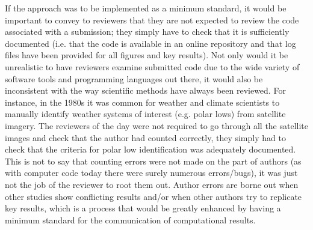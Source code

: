 If the \citet{Irving2015} approach was to be implemented as a minimum standard, it would be important to convey to reviewers that they are not expected to review the code associated with a submission; they simply have to check that it is sufficiently documented (i.e. that the code is available in an online repository and that log files have been provided for all figures and key results). Not only would it be unrealistic to have reviewers examine submitted code due to the wide variety of software tools and programming languages out there, it would also be inconsistent with the way scientific methods have always been reviewed. For instance, in the 1980s it was common for weather and climate scientists to manually identify weather systems of interest (e.g. polar lows) from satellite imagery. The reviewers of the day were not required to go through all the satellite images and check that the author had counted correctly, they simply had to check that the criteria for polar low identification was adequately documented. This is not to say that counting errors were not made on the part of authors (as with computer code today there were surely numerous errors/bugs), it was just not the job of the reviewer to root them out. Author errors are borne out when other studies show conflicting results and/or when other authors try to replicate key results, which is a process that would be greatly enhanced by having a minimum standard for the communication of computational results.